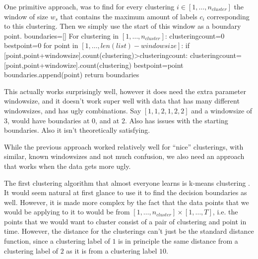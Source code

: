 
One primitive approach, was to find for every clustering $i \in [1,\ldots,n_{cluster}]$ the window of size $w_{s}$  that contains the maximum amount of labels  $c_i$ corresponding to this clustering. Then we simply use the start of this window as a boundary point. 
boundaries=[]
For clustering in $[1,\ldots,n_{cluster}]$:
clusteringcount=0
bestpoint=0
for point in $[1,\ldots,len(list)-windowsize]$:
if [point,point+windowsize].count(clustering)>clusteringcount:
clusteringcount=[point,point+windowize].count(clustering)
bestpoint=point
boundaries.append(point)
return boundaries


This actually works surprisingly well, however it does need the extra parameter windowsize, and it doesn't work super well with data that has many different windowsizes, and has ugly combinations. Say $[1,1,2,1,2,2]$ and a windowsize of $3$, would have boundaries at 0, and at 2. Also has issues with the starting boundaries. Also it isn't theoretically satisfying. 

While the previous approach worked relatively well for "`nice"'  clusterings, with similar, known windowsizes and not much confusion, we also need an approach that works when the data gets more ugly.

The first clustering algorithm that almost everyone learns  is k-means clustering . It would seem natural at first glance to use it to find the decision boundaries as well. However, it is made more complex by the fact that the data points that we would be applying to it to would be from $[1,\ldots,n_{cluster}]\times [1,\ldots,T]$, i.e. the points that we would want to cluster consist of a pair of clustering and point in time. However, the distance for the clusterings can't just be the standard distance function, since a clustering label of $1$ is in principle the same distance from a clustering label of $2$ as it is from a clustering label $10$.

